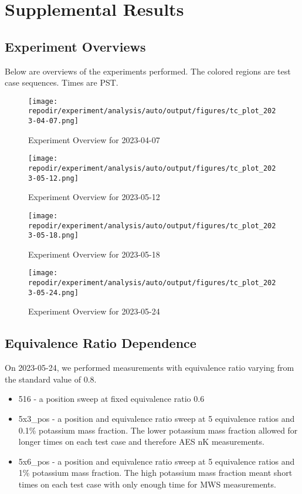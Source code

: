 \section{Supplemental Results}

\subsection{Experiment Overviews}

Below are overviews of the experiments performed. The colored regions are test case sequences. Times are PST. 

\begin{figure}[h]
    \texttt{[image: \\repodir/experiment/analysis/auto/output/figures/tc\_plot\_2023-04-07.png]} 
    \caption{Experiment Overview for 2023-04-07 }
    \label{fig:SI_expt_overview_2023-04-07}
\end{figure}


\begin{figure}[h]
    \texttt{[image: \\repodir/experiment/analysis/auto/output/figures/tc\_plot\_2023-05-12.png]} 
    \caption{Experiment Overview for 2023-05-12 }
    \label{fig:SI_expt_overview_2023-05-12}
\end{figure}


\begin{figure}[h]
    \texttt{[image: \\repodir/experiment/analysis/auto/output/figures/tc\_plot\_2023-05-18.png]} 
    \caption{Experiment Overview for 2023-05-18}
    \label{fig:SI_expt_overview_2023-05-18}
\end{figure}

\begin{figure}[h]
    \texttt{[image: \\repodir/experiment/analysis/auto/output/figures/tc\_plot\_2023-05-24.png]} 
    \caption{Experiment Overview for 2023-05-24}
    \label{fig:SI_expt_overview_2023-05-24}
\end{figure}

\clearpage

\subsection{Equivalence Ratio Dependence}

On 2023-05-24, we performed measurements with equivalence ratio varying from the standard value of 0.8. 

\begin{itemize}
    \item 516 - a position sweep at fixed equivalence ratio 0.6
    \item 5x3\_pos - a position and equivalence ratio sweep at 5 equivalence ratios and 0.1\% potassium mass fraction. The lower potassium mass fraction allowed for longer times on each test case and therefore AES nK measurements. 
    \item 5x6\_pos - a position and equivalence ratio sweep at 5 equivalence ratios and 1\% potassium mass fraction. The high potassium mass fraction meant short times on each test case with only enough time for MWS measurements. 
\end{itemize}


